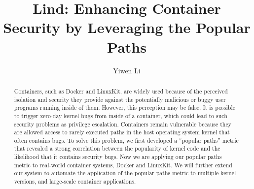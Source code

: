 \documentclass[letterpaper, onecolumn, 12pt]{article}
\author{Yiwen Li}
\begin{document}
\date{}

\title{\Large \bf Lind: Enhancing Container Security by Leveraging the Popular Paths}

\maketitle

\begin{abstract}

Containers, such as Docker and LinuxKit, are widely used because of the perceived isolation and security they provide against the potentially malicious or buggy user programs running inside of them. 
However, this perception may be false. It is possible to trigger zero-day kernel bugs from inside of a container, which could lead to such security problems as privilege escalation. 
Containers remain vulnerable because they are allowed  access to rarely executed paths in the host operating system kernel that often contains bugs. 
To solve this problem, we first developed a ``popular paths'' metric that revealed a strong correlation between the popularity of kernel code and the likelihood that it contains security bugs. 
Now we are applying our popular paths metric to real-world container systems, Docker and LinuxKit. We will further extend our system to automate the application of the popular paths metric 
to multiple kernel versions, and large-scale container applications. 

\end{abstract}








\end{document}
